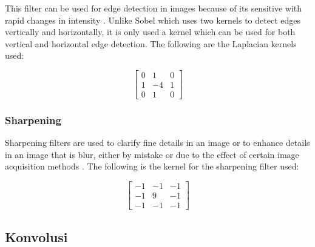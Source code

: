 This filter can be used for edge detection in images because of its sensitive with rapid changes in intensity \cite{pdf:jingbo}. Unlike Sobel which uses two kernels to detect edges vertically and horizontally, it is only used a kernel which can be used for both vertical and horizontal edge detection. The following are the Laplacian kernels used:

\begin{equation}
    \label{kernel:laplacian}
    \left[
    \begin{matrix}
 0 & 1 & 0 \\
 1 & -4 & 1 \\
 0 & 1 & 0
    \end{matrix}
    \right]
\end{equation}

\subsubsection{Sharpening}

Sharpening filters are used to clarify fine details in an image or to enhance details in an image that is blur, either by mistake or due to the effect of certain image acquisition methods \cite{pdf:ching}. The following is the kernel for the sharpening filter used:

\begin{equation}
    \label{kernel:sharpen}
    \left[
    \begin{matrix}
 -1 & -1 & -1 \\
 -1 & 9 & -1 \\
 -1 & -1 & -1
    \end{matrix}
    \right]
\end{equation}


\subsection{Konvolusi}


